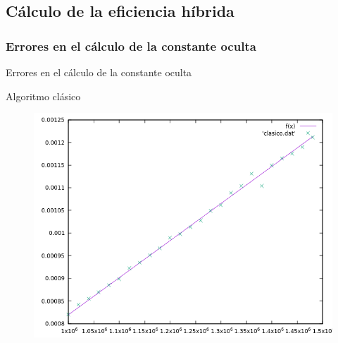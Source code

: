 \documentclass{beamer}
\begin{document}
\subsection{Cálculo de la eficiencia híbrida}

\subsubsection{Errores en el cálculo de la constante oculta}

\begin{frame}[fragile]{Errores en el cálculo de la constante oculta}
\begin{table}[H]
\centering
{}
\end{table}
\end{frame}

\begin{frame}[fragile]{Algoritmo clásico}
\begin{figure}[H]
\centering
\includegraphics[scale=0.5]{hibrida_clasico.png}
\end{figure}
\end{frame}
\end{document}
